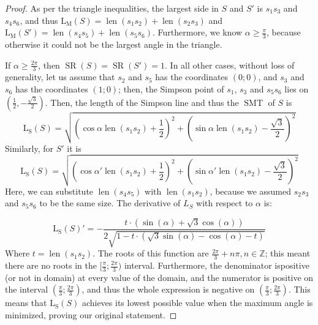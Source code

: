 \documentclass{mpaper}
\begin{document}
\begin{proof}
  As per the triangle inequalities, the largest side in $S$ and $S'$ is $s_1s_3$ and $s_4s_6$, and thus $\operatorname{L_M}(S)=\operatorname{len}(s_1s_2)+\operatorname{len}(s_2s_3)$ and $\operatorname{L_M}(S')=\operatorname{len}(s_4s_5)+\operatorname{len}(s_5s_6)$. Furthermore, we know $\alpha\geq\frac{\pi}{3}$, because otherwise it could not be the largest angle in the triangle.

  If $\alpha\geq\frac{2\pi}{3}$, then $\operatorname{SR}(S)=\operatorname{SR}(S')=1$. In all other cases, without loss of generality, let us assume that $s_2$ and $s_5$ has the coordinates $(0; 0)$, and $s_3$ and $s_6$ has the coordinates $(1;0)$; then, the Simpson point of $s_1$, $s_3$ and $s_5s_6$ lies on $(\frac{1}{2}, -\frac{\sqrt{3}}{2})$. Then, the length of the Simpson line and thus the $\operatorname{SMT}$ of $S$ is
  \[
    \operatorname{L_S}(S) = \sqrt{(\cos\alpha\operatorname{len}(s_1s_2)+\frac{1}{2})^2+(\sin\alpha\operatorname{len}(s_1s_2)-\frac{\sqrt{3}}{2})^2}
  \]
  Similarly, for $S'$ it is
  \[
    \operatorname{L_S}(S) = \sqrt{(\cos\alpha'\operatorname{len}(s_1s_2)+\frac{1}{2})^2+(\sin\alpha'\operatorname{len}(s_1s_2)-\frac{\sqrt{3}}{2})^2}
  \]
  Here, we can substitute $\operatorname{len}(s_4s_5)$ with $\operatorname{len}(s_1s_2)$, because we assumed $s_2s_3$ and $s_5s_6$ to be the same size. The derivative of $L_S$ with respect to $\alpha$ is:

  \[
    \operatorname{L_S}(S)' = -\dfrac{t\cdot\left(\sin\left({\alpha}\right)+\sqrt{3}\cos\left({\alpha}\right)\right)}{2\sqrt{1-t\cdot\left(\sqrt{3}\sin\left({\alpha}\right)-\cos\left({\alpha}\right)-t\right)}}
  \]
  Where $t=\operatorname{len}(s_1s_2)$. The roots of this function are $\frac{2\pi}{3}+n\pi, n\in\mathbb{Z}$; this meant there are no roots in the $[\frac{\pi}{3};\frac{2\pi}{3})$ interval. Furthermore, the denominator ispositive (or not in domain) at every value of the domain, and the numerator is positive on the interval $(\frac{\pi}{3};\frac{2\pi}{3})$, and thus the whole expression is negative on $(\frac{\pi}{3};\frac{2\pi}{3})$. This means that $\operatorname{L_S}(S)$ achieves its lowest possible value when the maximum angle is minimized, proving our original statement. 
\end{proof}
\end{document}
